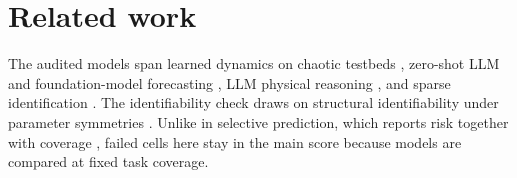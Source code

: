 \documentclass{article}
\begin{document}
\section{Related work}
\label{app:related}
The audited models span learned dynamics \citep{chen2018node,greydanus2019hnn,cranmer2020lnn}
on chaotic testbeds \citep{gilpin2021chaos}, zero-shot LLM and foundation-model forecasting
\citep{gruver2023llmtime,zhang2025zeroshotchaos,ansari2024chronos,das2024timesfm,woo2024moirai},
LLM physical reasoning \citep{lewkowycz2022minerva,wei2022cot,xu2025ugphysics}, and sparse
identification \citep{brunton2016sindy,gauthier2021nvar}. The identifiability check draws on
structural identifiability under parameter symmetries \citep{borgqvist2024symmetries}. Unlike
in selective prediction, which reports risk together with coverage \citep{geifman2017selective},
failed cells here stay in the main score because models are compared at fixed task coverage.
\end{document}
